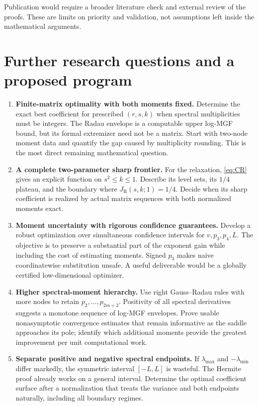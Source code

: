 \documentclass[11pt,letterpaper]{article}
\numberwithin{equation}{section}
\theoremstyle{definition}\newtheorem{definition}[theorem]{Definition}
\theoremstyle{remark}\newtheorem{remark}[theorem]{Remark}
\newcommand{\jRad}{J_{\mathrm R}}
\begin{document}
Publication would require a broader literature check and external
review of the proofs. These are limits on priority and validation,
not assumptions left inside the mathematical arguments.

\section{Further research questions and a proposed program}

\begin{enumerate}[leftmargin=*]
\item \textbf{Finite-matrix optimality with both moments fixed.}
Determine the exact best coefficient for prescribed
$(r,s,k)$ when spectral multiplicities must be integers. The Radau
envelope is a computable upper log-MGF bound, but its formal
extremizer need not be a matrix. Start with two-node moment data
and quantify the gap caused by multiplicity rounding. This is the
most direct remaining mathematical question.

\item \textbf{A complete two-parameter sharp frontier.}
For the relaxation, \eqref{eq:CR} gives an explicit function on
$s^2\le k\le1$. Describe its level sets, its $1/4$ plateau, and the
boundary where $\jRad(s,k;1)=1/4$. Decide when its sharp
coefficient is realized by actual matrix sequences with both
normalized moments exact.

\item \textbf{Moment uncertainty with rigorous confidence guarantees.}
Develop a robust optimization over simultaneous confidence intervals
for $v,p_3,p_4,L$. The objective is to preserve a substantial part of
the exponent gain while including the cost of estimating moments.
Signed $p_3$ makes naive coordinatewise substitution unsafe. A useful
deliverable would be a globally certified low-dimensional optimizer.

\item \textbf{Higher spectral-moment hierarchy.}
Use right Gauss--Radau rules with more nodes to retain
$p_2,\ldots,p_{2m+2}$. Positivity of all spectral derivatives
suggests a monotone sequence of log-MGF envelopes. Prove usable
nonasymptotic convergence estimates that remain informative as the
saddle approaches its pole; identify which additional moments
provide the greatest improvement per unit computational work.

\item \textbf{Separate positive and negative spectral endpoints.}
If $\lambda_{\max}$ and $-\lambda_{\min}$ differ markedly, the
symmetric interval $[-L,L]$ is wasteful. The Hermite proof already
works on a general interval. Determine the optimal coefficient
surface after a normalization that treats the variance and both
endpoints naturally, including all boundary regimes.


\end{enumerate}
\end{document}
